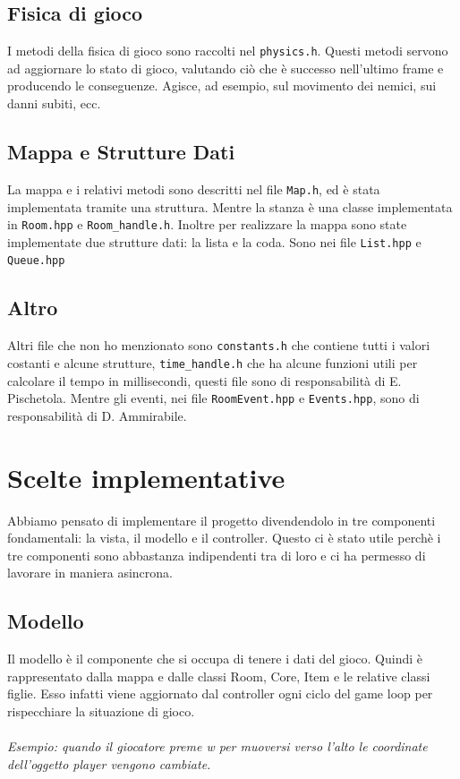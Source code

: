 \documentclass{article}
\begin{document}
\subsection{Fisica di gioco}
I metodi della fisica di gioco sono raccolti nel \texttt{physics.h}. Questi metodi servono ad aggiornare lo stato di gioco, valutando ciò che è successo nell'ultimo frame e producendo le conseguenze. Agisce, ad esempio, sul movimento dei nemici, sui danni subiti, ecc.

\subsection{Mappa e Strutture Dati}
La mappa e i relativi metodi sono descritti nel file \texttt{Map.h}, ed è stata implementata tramite una struttura. Mentre la stanza è una classe implementata in \texttt{Room.hpp} e \texttt{Room\_handle.h}. Inoltre per realizzare la mappa sono state implementate due strutture dati: la lista e la coda. Sono nei file \texttt{List.hpp} e \texttt{Queue.hpp}

\subsection{Altro}
Altri file che non ho menzionato sono \texttt{constants.h} che contiene tutti i valori costanti e alcune strutture, \texttt{time\_handle.h} che ha alcune funzioni utili per calcolare il tempo in millisecondi, questi file sono di responsabilità di E. Pischetola. Mentre gli eventi, nei file \texttt{RoomEvent.hpp} e \texttt{Events.hpp}, sono di responsabilità di D. Ammirabile.

\section{Scelte implementative}
Abbiamo pensato di implementare il progetto divendendolo in tre componenti fondamentali: la vista, il modello e il controller. Questo ci è stato utile perchè i tre componenti sono abbastanza indipendenti tra di loro e ci ha permesso di lavorare in maniera asincrona.

\subsection{Modello}
Il modello è il componente che si occupa di tenere i dati del gioco. Quindi è rappresentato dalla mappa e dalle classi Room, Core, Item e le relative classi figlie.
Esso infatti viene aggiornato dal controller ogni ciclo del game loop per rispecchiare la situazione di gioco.
\\\\
\textit{Esempio: quando il giocatore preme w per muoversi verso l'alto le coordinate dell'oggetto player vengono cambiate.}
\end{document}
